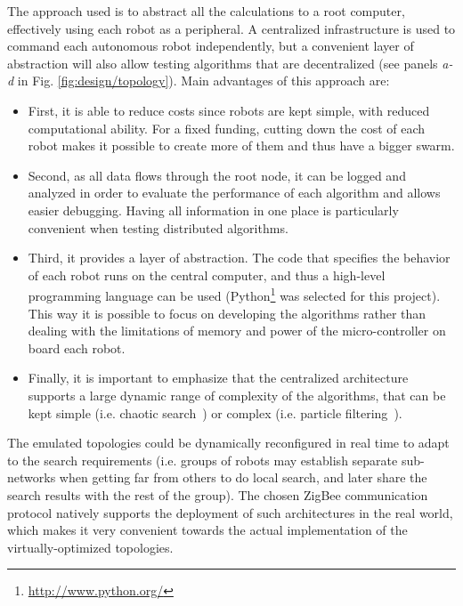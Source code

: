 The approach used is to abstract all the calculations to a root computer, effectively using each robot as a peripheral.
A centralized infrastructure is used to command each autonomous robot independently, but a convenient layer of abstraction will also allow testing algorithms that are decentralized (see panels \emph{a-d} in Fig. \ref{fig:design/topology}). Main advantages of this approach are:
\begin{itemize}
\item First, it is able to reduce costs since robots are kept simple, with reduced computational ability. For a fixed funding, cutting down the cost of each robot makes it possible to create more of them and thus have a bigger swarm.
\item Second, as all data flows through the root node, it can be logged and analyzed in order to evaluate the performance of each algorithm and allows easier debugging. Having all information in one place is particularly convenient when testing distributed algorithms.
\item Third, it provides a layer of abstraction. The code that specifies the behavior of each robot runs on the central computer, and thus a high-level programming language can be used (Python\footnote{\url{http://www.python.org/}} was selected for this project). This way it is possible to focus on developing the algorithms rather than dealing with the limitations of memory and power of the micro-controller on board each robot.
\item Finally, it is important to emphasize that the centralized architecture supports a large dynamic range of complexity of the algorithms, that can be kept simple (i.e. chaotic search~\cite{KongcunM09}) or complex (i.e. particle filtering~\cite{Marques2006}).
\end{itemize}

The emulated topologies could be dynamically reconfigured in real time to adapt to the search requirements (i.e. groups of robots may establish separate sub-networks when getting far from others to do local search, and later share the search results with the rest of the group).
The chosen ZigBee communication protocol natively supports the deployment of such architectures in the real world, which makes it very convenient towards the actual implementation of the virtually-optimized topologies.











